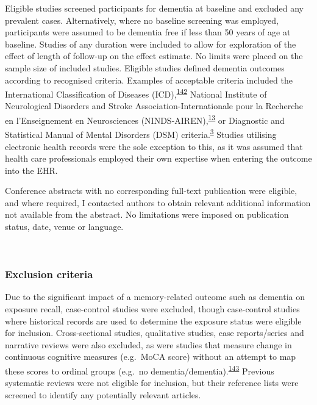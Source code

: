 \documentclass[a4paper, twoside]{templates/ociamthesis}
\begin{document}
Eligible studies screened participants for dementia at baseline and excluded any prevalent cases. Alternatively, where no baseline screening was employed, participants were assumed to be dementia free if less than 50 years of age at baseline. Studies of any duration were included to allow for exploration of the effect of length of follow-up on the effect estimate. No limits were placed on the sample size of included studies. Eligible studies defined dementia outcomes according to recognised criteria. Examples of acceptable criteria included the International Classification of Diseases (ICD),\textsuperscript{\protect\hyperlink{ref-organizationwho1993}{142}} National Institute of Neurological Disorders and Stroke Association-Internationale pour la Recherche en l'Enseignement en Neurosciences (NINDS-AIREN),\textsuperscript{\protect\hyperlink{ref-roman1993}{13}} or Diagnostic and Statistical Manual of Mental Disorders (DSM) criteria.\textsuperscript{\protect\hyperlink{ref-edition2013}{3}} Studies utilising electronic health records were the sole exception to this, as it was assumed that health care professionals employed their own expertise when entering the outcome into the EHR.

Conference abstracts with no corresponding full-text publication were eligible, and where required, I contacted authors to obtain relevant additional information not available from the abstract. No limitations were imposed on publication status, date, venue or language.

~

\hypertarget{exclusion-criteria}{%
\subsubsection{Exclusion criteria}\label{exclusion-criteria}}

Due to the significant impact of a memory-related outcome such as dementia on exposure recall, case-control studies were excluded, though case-control studies where historical records are used to determine the exposure status were eligible for inclusion. Cross-sectional studies, qualitative studies, case reports/series and narrative reviews were also excluded, as were studies that measure change in continuous cognitive measures (e.g.~MoCA score) without an attempt to map these scores to ordinal groups (e.g.~no dementia/dementia).\textsuperscript{\protect\hyperlink{ref-tennant2021}{143}} Previous systematic reviews were not eligible for inclusion, but their reference lists were screened to identify any potentially relevant articles.
\end{document}
